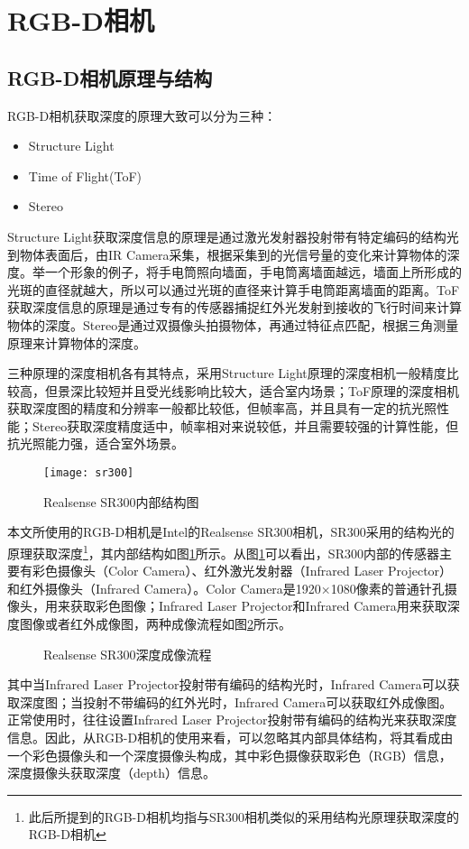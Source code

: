 \section{RGB-D相机}
\subsection{RGB-D相机原理与结构}
RGB-D相机获取深度的原理大致可以分为三种：
\begin{itemize}
\item Structure Light
\item Time of Flight(ToF)
\item Stereo
\end{itemize}

Structure Light获取深度信息的原理是通过激光发射器投射带有特定编码的结构光到物体表面后，由IR Camera采集，根据采集到的光信号量的变化来计算物体的深度。举一个形象的例子，将手电筒照向墙面，手电筒离墙面越远，墙面上所形成的光斑的直径就越大，所以可以通过光斑的直径来计算手电筒距离墙面的距离。ToF获取深度信息的原理是通过专有的传感器捕捉红外光发射到接收的飞行时间来计算物体的深度。Stereo是通过双摄像头拍摄物体，再通过特征点匹配，根据三角测量原理来计算物体的深度。

三种原理的深度相机各有其特点，采用Structure Light原理的深度相机一般精度比较高，但景深比较短并且受光线影响比较大，适合室内场景；ToF原理的深度相机获取深度图的精度和分辨率一般都比较低，但帧率高，并且具有一定的抗光照性能；Stereo获取深度精度适中，帧率相对来说较低，并且需要较强的计算性能，但抗光照能力强，适合室外场景。

\begin{figure}[!ht]
  \centering
  \texttt{[image: sr300]}
  \caption{Realsense SR300内部结构图}
  \label{fig:sr300}
\end{figure}
本文所使用的RGB-D相机是Intel的Realsense SR300相机，SR300采用的结构光的原理获取深度\footnote{此后所提到的RGB-D相机均指与SR300相机类似的采用结构光原理获取深度的RGB-D相机}，其内部结构如图\ref{fig:sr300}所示。从图\ref{fig:sr300}可以看出，SR300内部的传感器主要有彩色摄像头（Color Camera）、红外激光发射器（Infrared Laser Projector）和红外摄像头（Infrared Camera）。Color Camera是1920×1080像素的普通针孔摄像头，用来获取彩色图像；Infrared Laser Projector和Infrared Camera用来获取深度图像或者红外成像图，两种成像流程如图\ref{fig:capture_flow}所示。
\begin{figure}[!ht]
  \centering
  \vfill
  \caption{Realsense SR300深度成像流程}
  \label{fig:capture_flow}
\end{figure}
其中当Infrared Laser Projector投射带有编码的结构光时，Infrared Camera可以获取深度图；当投射不带编码的红外光时，Infrared Camera可以获取红外成像图。正常使用时，往往设置Infrared Laser Projector投射带有编码的结构光来获取深度信息。因此，从RGB-D相机的使用来看，可以忽略其内部具体结构，将其看成由一个彩色摄像头和一个深度摄像头构成，其中彩色摄像获取彩色（RGB）信息，深度摄像头获取深度（depth）信息。


